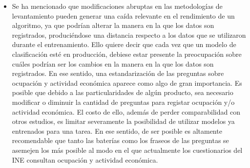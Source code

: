 \documentclass[
  12pt,
  spanish,
]{article}
\begin{document}
\begin{itemize}
  \item Se ha mencionado que modificaciones abruptas en las metodologías de levantamiento pueden generar una caída relevante en el rendimiento de un algoritmo, ya que podrían alterar la manera en la que los datos son registrados, produciéndose una distancia respecto a los datos que se utilizaron durante el entrenamiento. Ello quiere decir que cada vez que un modelo de clasificación esté en producción, debiese estar presente la preocupación sobre cuáles podrían ser los cambios en la manera en la que los datos son registrados. En ese sentido, una estandarización de las preguntas sobre ocupación y actividad económica aparece como algo de gran importancia. Es posible que debido a las particularidades de algún producto, sea necesario modificar o diminuir la cantidad de preguntas para registar ocupación y/o actividad económica. El costo de ello, además de perder comparabilidad con otros estudios, es limitar severamente la posibilidad de utilizar modelos ya entrenados para una tarea. En ese sentido, de ser posible es altamente recomendable que tanto las baterías como los fraseos de las preguntas se asemejen los más posible al modo en el que actualmente los cuestionarios del INE consultan ocupación y actividad económica.       


\end{itemize}
\end{document}
